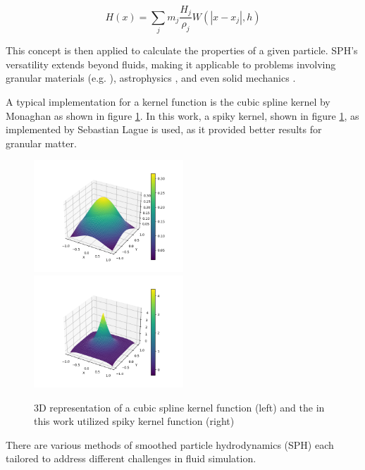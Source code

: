 \documentclass[intern]{cgMA}
\begin{document}
    \begin{equation}
        H(x) = \sum_j m_j \frac{H_j}{\rho_j} W(|x - x_j|, h)
    \end{equation}

    This concept is then applied to calculate the properties of a given particle. SPH's versatility extends beyond fluids, making it applicable to problems involving granular materials (e.g. \cite{10.2312:LocalChapterEvents:CEIG:CEIG09:011-018}), astrophysics \cite{Springel_2010}, and even solid mechanics \cite{solid_mechanics}. 

    A typical implementation for a kernel function is the cubic spline kernel by Monaghan \cite{doi:10.1146/annurev.aa.30.090192.002551} as shown in figure \ref{fig:kernels}. In this work, a spiky kernel, shown in figure \ref{fig:kernels}, as implemented by Sebastian Lague \cite{seblague} is used, as it provided better results for granular matter. \\

    \begin{figure}[H]
        \includegraphics[width=0.5\textwidth]{figures/cubic_spline.png}
        \includegraphics[width=0.5\textwidth]{figures/spiky.png}
        \caption[Kernel functions]{3D representation of a cubic spline kernel function (left) and the in this work utilized spiky kernel function (right)}
        \label{fig:kernels}
    \end{figure}

    There are various methods of smoothed particle hydrodynamics (SPH) each tailored to address different challenges in fluid simulation.
\end{document}
